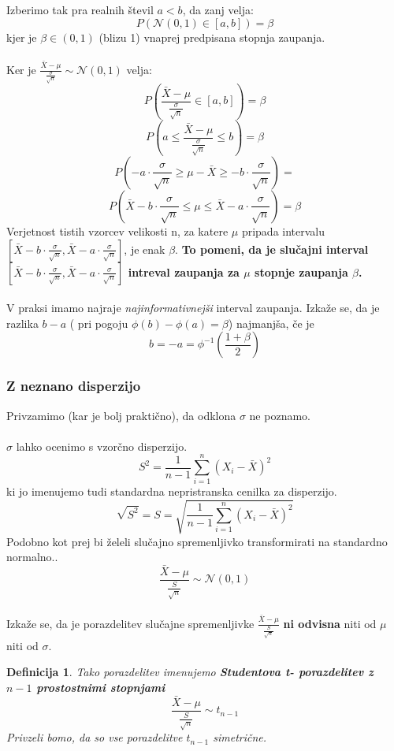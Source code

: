 \documentclass[11pt]{article}
\newtheorem{Definicija}[Izrek]{{\sc Definicija}}
\begin{document}
Izberimo tak pra realnih števil $a < b$, da zanj velja:
$$ P(\mathcal{N}(0,1) \in [a,b]) = \beta$$
kjer je $\beta \in (0,1)$ (blizu 1) vnaprej predpisana stopnja zaupanja.
\\
\\
Ker je $\frac{\bar{X} - \mu}{\frac{\sigma}{\sqrt{n}}}\sim \mathcal{N}(0,1)$ velja:
$$P\left(\frac{\bar{X} - \mu}{\frac{\sigma}{\sqrt{n}}}\in [a,b]\right) = \beta$$
$$P\left(a \le \frac{\bar{X} - \mu}{\frac{\sigma}{\sqrt{n}}}  \le b \right) = \beta $$
$$P(-a\cdot \frac{\sigma}{\sqrt{n}} \ge \mu - \bar{X}\ge -b\cdot \frac{\sigma}{\sqrt{n}})=$$
$$P(\bar{X}-b\cdot \frac{\sigma}{\sqrt{n}} \le \mu \le \bar{X} - a\cdot \frac{\sigma}{\sqrt{n}}) = \beta
$$
Verjetnost tistih vzorcev velikosti n, za katere $\mu$ pripada intervalu $[\bar{X}-b\cdot \frac{\sigma}{\sqrt{n}}, \bar{X} - a\cdot \frac{\sigma}{\sqrt{n}}]$, je enak $\beta$.
\textbf{To pomeni, da je slučajni interval $[\bar{X}-b\cdot \frac{\sigma}{\sqrt{n}}, \bar{X} - a\cdot \frac{\sigma}{\sqrt{n}}]$ intreval zaupanja za  $\mu$  stopnje zaupanja $\beta$.}
\\
\\
V praksi imamo najraje \textit{najinformativnejši} interval zaupanja. Izkaže se, da je razlika $b-a$ ( pri pogoju $\phi(b) - \phi(a) = \beta$) najmanjša, če je 
$$b = -a = \phi^{-1}\left(\frac{1+\beta}{2}\right)$$ 

\subsubsection{Z neznano disperzijo}
Privzamimo (kar je bolj praktično), da odklona $\sigma$ ne poznamo.
\\
\\
$\sigma$ lahko ocenimo s vzorčno disperzijo.
$$S^2 = \frac{1}{n-1}\sum_{i = 1}^{n}({X_i- \bar{X}})^2$$
ki jo imenujemo tudi standardna nepristranska cenilka za disperzijo.
$$\sqrt{S^2}= S = \sqrt{\frac{1}{n-1}\sum_{i = 1}^{n}({X_i- \bar{X}})^2}$$
Podobno kot prej bi želeli slučajno spremenljivko transformirati na standardno normalno..
$$\frac{\bar{X}- \mu}{\frac{S}{\sqrt{n}}} \sim \mathcal{N}(0,1)$$
\\
Izkaže se, da je porazdelitev slučajne spremenljivke $\frac{\bar{X}- \mu}{\frac{S}{\sqrt{n}}}$ \textbf{ni odvisna } niti od $\mu$ niti od $\sigma$.
\\

\begin{Definicija}
	Tako porazdelitev imenujemo \textbf{Studentova t- porazdelitev z $n-1$ prostostnimi stopnjami}
	$$\frac{\bar{X}- \mu}{\frac{S}{\sqrt{n}}}\sim t_{n-1}$$
	Privzeli bomo, da so vse porazdelitve $t_{n-1}$ simetrične.
\end{Definicija}
\end{document}
